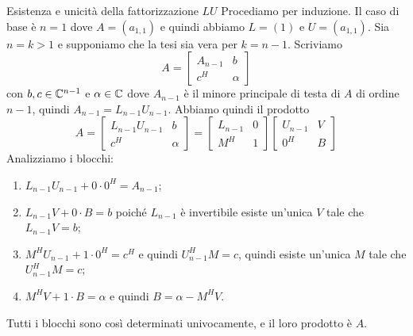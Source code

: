 \documentclass[a4paper]{article}
\begin{document}
\begin{snippetproof}{Esistenza e unicità della fattorizzazione \(LU\)}
    Procediamo per induzione.
    Il caso di base è \(n=1\) dove \(A = (a_{1,1})\) e quindi abbiamo
    \(L = (1)\) e \(U=(a_{1,1})\).
    Sia \(n=k>1\) e supponiamo che la tesi sia vera per \(k = n-1\).
    Scriviamo
    \[
        A = \left[
            \begin{array}{c|c}
                A_{n-1} & b \\
                \hline
                c^H & \alpha
            \end{array}
        \right]
    \]
    con \(b,c \in \mathbb{C}^{n-1}\) e \(\alpha \in \mathbb{C}\) dove \(A_{n-1}\) è
    il minore principale di testa di \(A\) di ordine \(n-1\), quindi \(A_{n-1} = L_{n-1}U_{n-1}\).
    Abbiamo quindi il prodotto
    \[
        A = \left[
            \begin{array}{c|c}
                L_{n-1}U_{n-1} & b \\
                \hline
                c^H & \alpha
            \end{array}
        \right] = \left[
            \begin{array}{c|c}
                L_{n-1} & 0 \\
                \hline
                M^H & 1
            \end{array}
        \right] \left[
            \begin{array}{c|c}
                U_{n-1} & V \\
                \hline
                0^H & B
            \end{array}
        \right]
    \]
    Analizziamo i blocchi:
    \begin{enumerate}
        \item \(L_{n-1}U_{n-1} + 0\cdot0^H = A_{n-1}\);
        \item \(L_{n-1}V + 0\cdot B = b\) poiché \(L_{n-1}\) è invertibile esiste un'unica \(V\) tale che \(L_{n-1}V =b\);
        \item \(M^H U_{n-1} + 1 \cdot 0^H = c^H\) e quindi \(U_{n-1}^H M = c\), quindi esiste un'unica \(M\) tale che \(U_{n-1}^H M = c\);
        \item \(M^H V + 1 \cdot B = \alpha\) e quindi \(B = \alpha - M^H V\).
    \end{enumerate}
    Tutti i blocchi sono così determinati univocamente, e il loro prodotto è \(A\).
\end{snippetproof}
\end{document}
